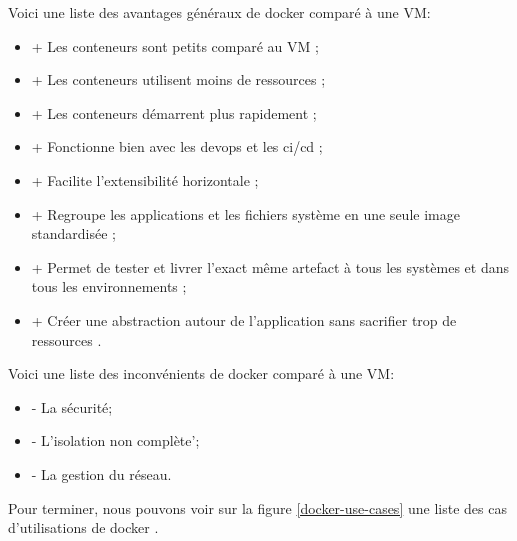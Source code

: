 \documentclass[
    iai, %
    il, %
]{heig-tb}
\begin{document}

Voici une liste des avantages généraux de \Gls{docker} comparé à une VM:
\begin{itemize}
    \item + Les \Gls{conteneur}s sont petits comparé au VM \cite{koukia,nick}; %
    \item + Les \Gls{conteneur}s utilisent moins de ressources \cite{koukia};
    \item + Les \Gls{conteneur}s démarrent plus rapidement \cite{koukia};
    \item + Fonctionne bien avec les \Gls{devops} et les \Gls{ci}/\Gls{cd} \cite{koukia,data-flair-pros-cons,data-flair-use-cases};
    \item + Facilite l'extensibilité horizontale \cite{data-flair-use-cases};
    \item + Regroupe les applications et les fichiers système en une seule image standardisée \cite{kane2018docker};
    \item + Permet de tester et livrer l'exact même artefact à tous les systèmes et dans tous les
          environnements \cite{kane2018docker,nick};
    \item + Créer une abstraction autour de l'application sans sacrifier trop de ressources \cite{kane2018docker}.
\end{itemize}

Voici une liste des inconvénients de \Gls{docker} comparé à une VM:
\begin{itemize}
    \item - La sécurité; \cite{koukia}
    \item - L'isolation non complète'; \cite{koukia}
    \item - La gestion du réseau. \cite{koukia}
\end{itemize}

Pour terminer, nous pouvons voir sur la figure \ref{docker-use-cases} une liste des cas d'utilisations de \Gls{docker} \cite{data-flair-use-cases}.
\end{document}
